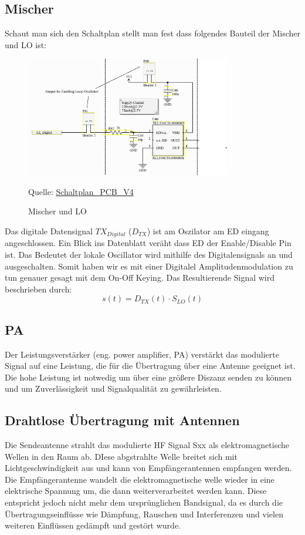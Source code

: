 \subsection{Mischer}
Schaut man sich den Schaltplan stellt man fest dass folgendes Bauteil der Mischer und LO ist:
\begin{figure}[H]
    \centering
    \includegraphics[width=0.8\textwidth]{Pictures/MischerLO.png}
    \caption{Mischer und LO}
    \footnotesize{Quelle: \url{Schaltplan_PCB_V4}}
    \label{fig:link_budget}
\end{figure}
Das digitale Datensignal $TX_{Digital}$ ($D_{TX}$) ist am Oszilator am ED eingang angeschlossen.
Ein Blick ins Datenblatt veräht dass ED der Enable/Disable Pin ist.
Das Bedeutet der lokale Oscillator wird mithilfe des Digitalensignals an und ausgeschalten.
Somit haben wir es mit einer Digitalel Amplitudenmodulation zu tun genauer gesagt mit dem 
On-Off Keying. Das Resultierende Signal wird beschrieben durch:
\begin{equation}
    s(t) = D_{TX}(t)\cdot S_{LO}(t)
\end{equation}





\subsection{PA}
Der Leistungsverstärker (eng. power amplifier, PA) verstärkt das modulierte Signal auf eine Leistung, die für die Übertragung über eine Antenne 
geeignet ist. Die hohe Leistung ist notwedig um über eine größere Diszanz senden zu können und um Zuverlässigkeit und
Signalqualität zu gewährleisten. 

\subsection{Drahtlose Übertragung mit Antennen}
Die Sendeantenne strahlt das modulierte HF Signal Sxx als elektromagnetische Wellen in den Raum ab. DIese abgstrahlte Welle
breitet sich mit Lichtgeschwindigkeit aus und kann von Empfängerantennen empfangen werden. Die Empfängerantenne wandelt
die elektromagnetische welle wieder in eine elektrische Spannung um, die dann weiterverarbeitet werden kann. Diese entspricht
jedoch nicht mehr dem ursprünglichen Bandsignal, da es durch die Übertragungseinflüsse wie Dämpfung, Rauschen und Interferenzen
und vielen weiteren Einflüssen gedämpft und gestört wurde.

